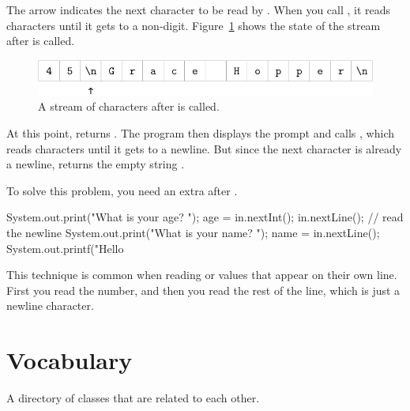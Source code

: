 {{%

The arrow indicates the next character to be read by .
When you call , it reads characters until it gets to a non-digit.
Figure~\ref{fig.hopper2} shows the state of the stream after  is called.

\begin{figure}[!ht]
\begin{center}
\includegraphics{figs/hopper2.pdf}
\caption{A stream of characters after  is called.}
\label{fig.hopper2}
\end{center}
\end{figure}

At this point,  returns .
The program then displays the prompt  and calls , which reads characters until it gets to a newline.
But since the next character is already a newline,  returns the empty string .

To solve this problem, you need an extra  after .

\begin{code}
System.out.print("What is your age? ");
age = in.nextInt();
in.nextLine();  // read the newline
System.out.print("What is your name? ");
name = in.nextLine();
System.out.printf("Hello %
\end{code}

This technique is common when reading  or  values that appear on their own line.
First you read the number, and then you read the rest of the line, which is just a newline character.



\section{Vocabulary}

\begin{description}

A directory of classes that are related to each other.


\end{description}}}
